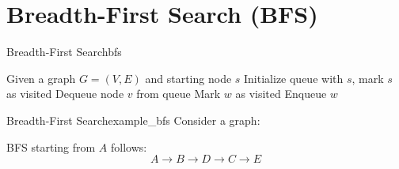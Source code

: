 
\section{Breadth-First Search (BFS)}
\begin{algorithmtcb}
    {Breadth-First Search}{bfs}
    \begin{algorithmic}
        \State{} Given a graph $G = (V, E)$ and starting node $s$
        \State{} Initialize queue with $s$, mark $s$ as visited
            \State{} Dequeue node $v$ from queue
                \State{} Mark $w$ as visited
                \State{} Enqueue $w$
            \EndFor{}
        \EndWhile{}
    \end{algorithmic}
\end{algorithmtcb}

\begin{exampletcb}
    {Breadth-First Search}{example_bfs}
    Consider a graph:
\begin{center}
\end{center}
    BFS starting from $A$ follows:
    \[
    A \rightarrow B \rightarrow D \rightarrow C \rightarrow E
    \]
\end{exampletcb}

